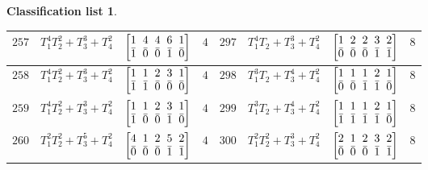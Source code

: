 \documentclass[10pt,a4paper]{amsart}
\theoremstyle{definition}
\newtheorem{class-list}[thm]{Classification list}
\numberwithin{equation}{section}
\begin{document}
\begin{class-list}
\begin{table}[h!]
\begin{tabu}{c|c|c|c||c|c|c|c}
\\
\hline
${257}$&${T_{1}^{4}T_{2}^{2}+T_{3}^{3}+T_{4}^{2}}$
&$\arraycolsep=1mm\begin{bmatrix}{1} & {4} & {4} & {6} & {1} \\ {\bar{1}} & {\bar{0}} & {\bar{0}} & {\bar{1}} & {\bar{0}}\end{bmatrix}$&${4}$
&${297}$&${T_{1}^{4}T_{2}+T_{3}^{3}+T_{4}^{2}}$
&$\arraycolsep=1mm\begin{bmatrix}{1} & {2} & {2} & {3} & {2} \\ {\bar{0}} & {\bar{0}} & {\bar{0}} & {\bar{1}} & {\bar{1}}\end{bmatrix}$&${8}$
\\
\hline
${258}$&${T_{1}^{4}T_{2}^{2}+T_{3}^{3}+T_{4}^{2}}$
&$\arraycolsep=1mm\begin{bmatrix}{1} & {1} & {2} & {3} & {1} \\ {\bar{1}} & {\bar{1}} & {\bar{0}} & {\bar{0}} & {\bar{0}}\end{bmatrix}$&${4}$
&${298}$&${T_{1}^{3}T_{2}+T_{3}^{4}+T_{4}^{2}}$
&$\arraycolsep=1mm\begin{bmatrix}{1} & {1} & {1} & {2} & {1} \\ {\bar{0}} & {\bar{0}} & {\bar{1}} & {\bar{1}} & {\bar{0}}\end{bmatrix}$&${8}$
\\
\hline
${259}$&${T_{1}^{4}T_{2}^{2}+T_{3}^{3}+T_{4}^{2}}$
&$\arraycolsep=1mm\begin{bmatrix}{1} & {1} & {2} & {3} & {1} \\ {\bar{1}} & {\bar{0}} & {\bar{0}} & {\bar{1}} & {\bar{0}}\end{bmatrix}$&${4}$
&${299}$&${T_{1}^{3}T_{2}+T_{3}^{4}+T_{4}^{2}}$
&$\arraycolsep=1mm\begin{bmatrix}{1} & {1} & {1} & {2} & {1} \\ {\bar{1}} & {\bar{1}} & {\bar{1}} & {\bar{1}} & {\bar{0}}\end{bmatrix}$&${8}$
\\
\hline
${260}$&${T_{1}^{2}T_{2}^{2}+T_{3}^{5}+T_{4}^{2}}$
&$\arraycolsep=1mm\begin{bmatrix}{4} & {1} & {2} & {5} & {2} \\ {\bar{0}} & {\bar{0}} & {\bar{0}} & {\bar{1}} & {\bar{1}}\end{bmatrix}$&${4}$
&${300}$&${T_{1}^{2}T_{2}^{2}+T_{3}^{3}+T_{4}^{2}}$
&$\arraycolsep=1mm\begin{bmatrix}{2} & {1} & {2} & {3} & {2} \\ {\bar{0}} & {\bar{0}} & {\bar{0}} & {\bar{1}} & {\bar{1}}\end{bmatrix}$&${8}$

\end{tabu}
\end{table}
\end{class-list}
\end{document}
